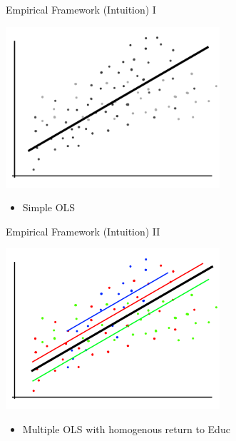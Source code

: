 \documentclass[10pt,ignorenonframetext,]{beamer}
\providecommand{\tightlist}{%
  \setlength{\itemsep}{0pt}\setlength{\parskip}{0pt}}
\begin{document}
\begin{frame}{Empirical Framework (Intuition) I}
\protect\hypertarget{empirical-framework-intuition-i}{}

\includegraphics[width=3.125in,height=\textheight]{img/rcmodel001.png}

\begin{itemize}
\tightlist
\item
  Simple OLS
\end{itemize}

\end{frame}

\begin{frame}{Empirical Framework (Intuition) II}
\protect\hypertarget{empirical-framework-intuition-ii}{}

\includegraphics[width=3.125in,height=\textheight]{img/rcmodel002.png}

\begin{itemize}
\tightlist
\item
  Multiple OLS with homogenous return to Educ
\end{itemize}

\end{frame}
\end{document}
